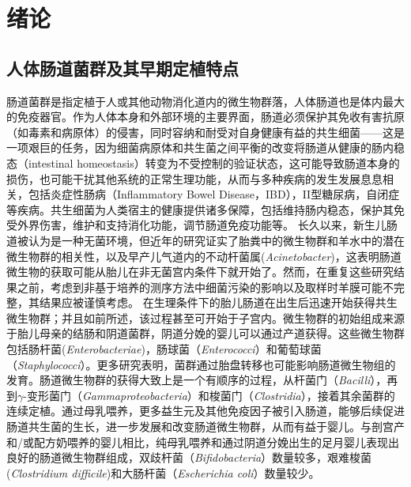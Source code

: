 
\chapter{绪论}
\label{chap:introduction}
\section{人体肠道菌群及其早期定植特点}
肠道菌群是指定植于人或其他动物消化道内的微生物群落，人体肠道也是体内最大的免疫器官。作为人体本身和外部环境的主要界面，肠道必须保护其免收有害抗原（如毒素和病原体）的侵害，同时容纳和耐受对自身健康有益的共生细菌——这是一项艰巨的任务，因为细菌病原体和共生菌之间平衡的改变将肠道从健康的肠内稳态（intestinal homeostasis）\cite{collier2005innate}转变为不受控制的验证状态，这可能导致肠道本身的损伤，也可能干扰其他系统的正常生理功能，从而与多种疾病的发生发展息息相关，包括炎症性肠病（Inflammatory Bowel Disease，IBD）\cite{ni2017gut}，II型糖尿病\cite{harsch2018role}，自闭症\cite{de2014altered, de2013fecal}等疾病。共生细菌为人类宿主的健康提供诸多保障，包括维持肠内稳态\cite{hooper2001commensal}，保护其免受外界伤害\cite{rakoff2004recognition}，维护和支持消化功能\cite{guarner2006mechanisms}，调节肠道免疫功能\cite{round2009gut,abreu2010toll}等。
长久以来，新生儿肠道被认为是一种无菌环境，但近年的研究证实了胎粪中的微生物群和羊水中的潜在微生物群的相关性\cite{ardissone2014meconium}，以及早产儿气道内的不动杆菌属(\textit{Acinetobacter})\cite{lohmann2014airway}，这表明肠道微生物的获取可能从胎儿在非无菌宫内条件下就开始了。然而，在重复这些研究结果之前，考虑到非基于培养的测序方法\cite{pennisi2014our}中细菌污染的影响以及取样时羊膜可能不完整，其结果应被谨慎考虑。
在生理条件下的胎儿肠道在出生后迅速开始获得共生微生物群；并且如前所述，该过程甚至可开始于子宫内。微生物群的初始组成来源于胎儿母亲的结肠和阴道菌群，阴道分娩的婴儿可以通过产道获得。这些微生物群包括肠杆菌(\textit{Enterobacteriae})，肠球菌（\textit{Enterococci}）和葡萄球菌（\textit{Staphylococci}）\cite{backhed2005host}。更多研究表明，菌群通过胎盘转移也可能影响肠道微生物组的发育\cite{aagaard2014placenta}。肠道微生物群的获得大致上是一个有顺序的过程，从杆菌门（\textit{Bacilli}），再到$\gamma$-变形菌门（\textit{Gammaproteobacteria}）和梭菌门（\textit{Clostridia}），接着其余菌群的连续定植\cite{la2014patterned}。通过母乳喂养，更多益生元及其他免疫因子被引入肠道，能够后续促进肠道共生菌的生长，进一步发展和改变肠道微生物群，从而有益于婴儿​​\cite{ouwehand2005prebiotics}。与剖宫产和/或配方奶喂养的婴儿相比，纯母乳喂养和通过阴道分娩出生的足月婴儿表现出良好的肠道微生物群组成，双歧杆菌（\textit{Bifidobacteria}）数量较多，艰难梭菌(\textit{Clostridium difficile})和大肠杆菌（\textit{Escherichia coli}）数量较少\cite{demehri2013hirschsprung}。


